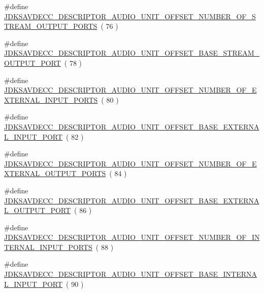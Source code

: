 \begin{DoxyCompactItemize}
\#define \hyperlink{group__descriptor__audio_ga4d430236874091a4f8a9c104927eded7}{J\+D\+K\+S\+A\+V\+D\+E\+C\+C\+\_\+\+D\+E\+S\+C\+R\+I\+P\+T\+O\+R\+\_\+\+A\+U\+D\+I\+O\+\_\+\+U\+N\+I\+T\+\_\+\+O\+F\+F\+S\+E\+T\+\_\+\+N\+U\+M\+B\+E\+R\+\_\+\+O\+F\+\_\+\+S\+T\+R\+E\+A\+M\+\_\+\+O\+U\+T\+P\+U\+T\+\_\+\+P\+O\+R\+TS}~( 76 )
\item 
\#define \hyperlink{group__descriptor__audio_gabead8ce7143859a537786e5356e9f2ad}{J\+D\+K\+S\+A\+V\+D\+E\+C\+C\+\_\+\+D\+E\+S\+C\+R\+I\+P\+T\+O\+R\+\_\+\+A\+U\+D\+I\+O\+\_\+\+U\+N\+I\+T\+\_\+\+O\+F\+F\+S\+E\+T\+\_\+\+B\+A\+S\+E\+\_\+\+S\+T\+R\+E\+A\+M\+\_\+\+O\+U\+T\+P\+U\+T\+\_\+\+P\+O\+RT}~( 78 )
\item 
\#define \hyperlink{group__descriptor__audio_ga4ed94b3df93206dcc1ac5fe3489fe5fa}{J\+D\+K\+S\+A\+V\+D\+E\+C\+C\+\_\+\+D\+E\+S\+C\+R\+I\+P\+T\+O\+R\+\_\+\+A\+U\+D\+I\+O\+\_\+\+U\+N\+I\+T\+\_\+\+O\+F\+F\+S\+E\+T\+\_\+\+N\+U\+M\+B\+E\+R\+\_\+\+O\+F\+\_\+\+E\+X\+T\+E\+R\+N\+A\+L\+\_\+\+I\+N\+P\+U\+T\+\_\+\+P\+O\+R\+TS}~( 80 )
\item 
\#define \hyperlink{group__descriptor__audio_ga670543f415f1ed238784feb58b765723}{J\+D\+K\+S\+A\+V\+D\+E\+C\+C\+\_\+\+D\+E\+S\+C\+R\+I\+P\+T\+O\+R\+\_\+\+A\+U\+D\+I\+O\+\_\+\+U\+N\+I\+T\+\_\+\+O\+F\+F\+S\+E\+T\+\_\+\+B\+A\+S\+E\+\_\+\+E\+X\+T\+E\+R\+N\+A\+L\+\_\+\+I\+N\+P\+U\+T\+\_\+\+P\+O\+RT}~( 82 )
\item 
\#define \hyperlink{group__descriptor__audio_gaed896d597b304effebb35128c7748b9d}{J\+D\+K\+S\+A\+V\+D\+E\+C\+C\+\_\+\+D\+E\+S\+C\+R\+I\+P\+T\+O\+R\+\_\+\+A\+U\+D\+I\+O\+\_\+\+U\+N\+I\+T\+\_\+\+O\+F\+F\+S\+E\+T\+\_\+\+N\+U\+M\+B\+E\+R\+\_\+\+O\+F\+\_\+\+E\+X\+T\+E\+R\+N\+A\+L\+\_\+\+O\+U\+T\+P\+U\+T\+\_\+\+P\+O\+R\+TS}~( 84 )
\item 
\#define \hyperlink{group__descriptor__audio_ga5932e01d14e9d7f00dbdbc1128609155}{J\+D\+K\+S\+A\+V\+D\+E\+C\+C\+\_\+\+D\+E\+S\+C\+R\+I\+P\+T\+O\+R\+\_\+\+A\+U\+D\+I\+O\+\_\+\+U\+N\+I\+T\+\_\+\+O\+F\+F\+S\+E\+T\+\_\+\+B\+A\+S\+E\+\_\+\+E\+X\+T\+E\+R\+N\+A\+L\+\_\+\+O\+U\+T\+P\+U\+T\+\_\+\+P\+O\+RT}~( 86 )
\item 
\#define \hyperlink{group__descriptor__audio_ga16343080ca19bc6b3883cadbd1ee1949}{J\+D\+K\+S\+A\+V\+D\+E\+C\+C\+\_\+\+D\+E\+S\+C\+R\+I\+P\+T\+O\+R\+\_\+\+A\+U\+D\+I\+O\+\_\+\+U\+N\+I\+T\+\_\+\+O\+F\+F\+S\+E\+T\+\_\+\+N\+U\+M\+B\+E\+R\+\_\+\+O\+F\+\_\+\+I\+N\+T\+E\+R\+N\+A\+L\+\_\+\+I\+N\+P\+U\+T\+\_\+\+P\+O\+R\+TS}~( 88 )
\item 
\#define \hyperlink{group__descriptor__audio_gad9369b622d192c1f875bddaec3939790}{J\+D\+K\+S\+A\+V\+D\+E\+C\+C\+\_\+\+D\+E\+S\+C\+R\+I\+P\+T\+O\+R\+\_\+\+A\+U\+D\+I\+O\+\_\+\+U\+N\+I\+T\+\_\+\+O\+F\+F\+S\+E\+T\+\_\+\+B\+A\+S\+E\+\_\+\+I\+N\+T\+E\+R\+N\+A\+L\+\_\+\+I\+N\+P\+U\+T\+\_\+\+P\+O\+RT}~( 90 )

\end{DoxyCompactItemize}
